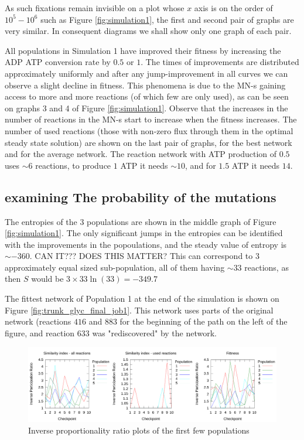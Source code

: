 \documentclass[10pt,a4paper]{article}
\begin{document}
As such fixations remain invisible on a plot whose $x$ axis is on the order of $10^5-10^6$ such as Figure \ref{fig:simulation1}, the first and second pair of graphs are very similar. In consequent diagrams we shall show only one graph of each pair.

All populations in Simulation 1 have improved their fitness by increasing the ADP ATP conversion rate by $0.5$ or $1$. The times of improvements are distributed approximately uniformly and after any jump-improvement in all curves we can observe a slight decline in fitness. This phenomena is due to the MN-s gaining access to more and more reactions (of which few are only used), as can be seen on graphs 3 and 4 of Figure \ref{fig:simulation1}. Observe that the increases in the number of reactions in the MN-s start to increase when the fitness increases. The number of used reactions (those with non-zero flux through them in the optimal steady state solution) are shown on the last pair of graphs, for the best network and for the average network. The reaction network with ATP production of $0.5$ uses $\sim 6$ reactions, to produce $1$ ATP it needs $\sim 10$, and for $1.5$ ATP it needs $14$. 

\subsection{examining The probability of the mutations}
\label{sub:the_probability_of_the_mutations}



The entropies of the $3$ populations are shown in the middle graph of Figure \ref{fig:simulation1}. The only significant jumps in the entropies can be identified with the improvements in the popoulations, and the steady value of entropy is $\sim -360$. CAN IT??? DOES THIS MATTER? This can correspond to $3$ approximately equal sized sub-population, all of them having $\sim 33$ reactions, as then $S$ would be $3\times 33 \ln \left( 33 \right)=-349.7$

The fittest network of Population 1 at the end of the simulation is shown on Figure \ref{fig:trunk_glyc_final_job1}. This network uses parts of the original network (reactions $416$ and $883$ for the beginning of the path on the left of the figure, and reaction $633$ was "rediscovered" by the network. 

\begin{figure}[htpb]
	\centering
	\includegraphics[width=1\linewidth]{IPR_longerlog.pdf}
	\caption{Inverse proportionality ratio plots of the first few populations}
	\label{fig:IPR_firstrun}
\end{figure}
\end{document}
